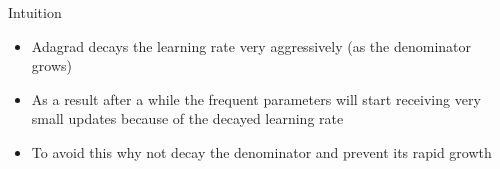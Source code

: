 \begin{frame}
	\begin{overlayarea}{\textwidth}{\textheight}
		\vspace{-0.2in}
		\begin{block}{Intuition}
			\begin{itemize}\justifying
				\item<1-> Adagrad decays the learning rate very aggressively (as the denominator grows)
				\item<2-> As a result after a while the frequent parameters will start receiving very small updates because of the decayed learning rate
				\item<3-> To avoid this why not decay the denominator and prevent its rapid growth
			\end{itemize}
		\end{block}
		
	\end{overlayarea}
\end{frame}


